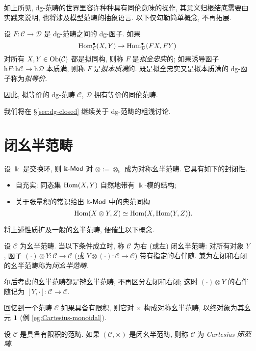 如上所见, dg-范畴的世界里容许种种具有同伦意味的操作, 其意义归根结底需要由实践来说明, 也将涉及模型范畴的抽象语言. 以下仅勾勒简单概念, 不再拓展.

\begin{definition}
	设 $F: \mathcal{C} \to \mathcal{D}$ 是 dg-范畴之间的 dg-函子. 如果
	\[ \operatorname{Hom}^\bullet_{\mathcal{C}}(X, Y) \to \operatorname{Hom}^\bullet_{\mathcal{D}}(FX, FY) \]
	对所有 $X, Y \in \operatorname{Ob}(\mathcal{C})$ 都是拟同构, 则称 $F$ 是\emph{拟全忠实}的; 如果诱导函子 $\mathrm{h}F: \mathrm{h}\mathcal{C} \to \mathrm{h}\mathcal{D}$ 本质满, 则称 $F$ 是\emph{拟本质满}的. 既是拟全忠实又是拟本质满的 dg-函子称为\emph{拟等价}.
\end{definition}

因此, 拟等价的 dg-范畴 $\mathcal{C}$, $\mathcal{D}$ 拥有等价的同伦范畴.

我们将在 \S\ref{sec:dg-closed} 继续关于 dg-范畴的粗浅讨论.

\section{闭幺半范畴}\label{sec:closed-monoidal}
设 $\Bbbk$ 是交换环, 则 $\Bbbk\text{-}\mathsf{Mod}$ 对 $\otimes := \otimes_{\Bbbk}$ 成为对称幺半范畴. 它具有如下的封闭性.
\begin{itemize}
	\item 自充实: 同态集 $\operatorname{Hom}(X, Y)$ 自然地带有 $\Bbbk$-模的结构;
	\item 关于张量积的常识给出 $\Bbbk\text{-}\mathsf{Mod}$ 中的典范同构
	\[ \operatorname{Hom}(X \otimes Y, Z) \simeq \operatorname{Hom}(X, \operatorname{Hom}(Y, Z)). \]
\end{itemize}
将上述性质扩及一般的幺半范畴, 便催生以下概念.

\begin{definition}\label{def:closed-monoidal-cat}
	设 $\mathcal{C}$ 为幺半范畴. 当以下条件成立时, 称 $\mathcal{C}$ 为右 (或左) 闭幺半范畴: 对所有对象 $Y$, 函子 $(\cdot) \otimes Y: \mathcal{C} \to \mathcal{C}$ (或 $Y \otimes (\cdot): \mathcal{C} \to \mathcal{C}$) 带有指定的右伴随. 兼为左闭和右闭的幺半范畴称为\emph{闭幺半范畴}.
\end{definition}

尔后考虑的幺半范畴都是辫幺半范畴, 不再区分左闭和右闭; 这时 $(\cdot) \otimes Y$ 的右伴随记为 $[Y, \cdot]: \mathcal{C} \to \mathcal{C}$.

回忆到一个范畴 $\mathcal{C}$ 如果具备有限积, 则它对 $\times$ 构成对称幺半范畴, 以终对象为其幺元 $\bm{1}$ (例 \ref{eg:Cartesius-monoidal}).

\begin{definition}\label{def:Cartesian-closed}
	设 $\mathcal{C}$ 是具备有限积的范畴. 如果 $(\mathcal{C}, \times)$ 是闭幺半范畴, 则称 $\mathcal{C}$ 为 \emph{Cartesius 闭范畴}.
\end{definition}

